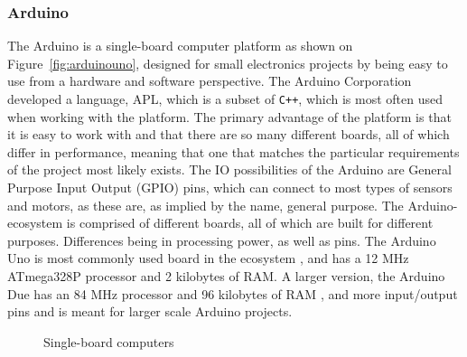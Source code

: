 \subsubsection{Arduino}
The Arduino is a single-board computer platform as shown on Figure~\ref{fig:arduinouno}, designed for small electronics projects by being easy to use from a hardware and software perspective.
The Arduino Corporation developed a language, APL, which is a subset of \texttt{C++}, which is most often used when working with the platform.
The primary advantage of the platform is that it is easy to work with and that there are so many different boards, all of which differ in performance, meaning that one that matches the particular requirements of the project most likely exists.
The IO possibilities of the Arduino are General Purpose Input Output (GPIO) pins, which can connect to most types of sensors and motors, as these are, as implied by the name, general purpose.
The Arduino-ecosystem is comprised of different boards, all of which are built for different purposes.
Differences being in processing power, as well as pins.
The Arduino Uno is most commonly used board in the ecosystem \cite{ArduinoUno3}, and has a 12 MHz ATmega328P processor and 2 kilobytes of RAM.
A larger version, the Arduino Due has an 84 MHz processor and 96 kilobytes of RAM \cite{ArduinoDue}, and more input/output pins and is meant for larger scale Arduino projects.

\begin{figure}[!tbp]
	\centering
	\hfill
	\caption{Single-board computers}
  \end{figure}

